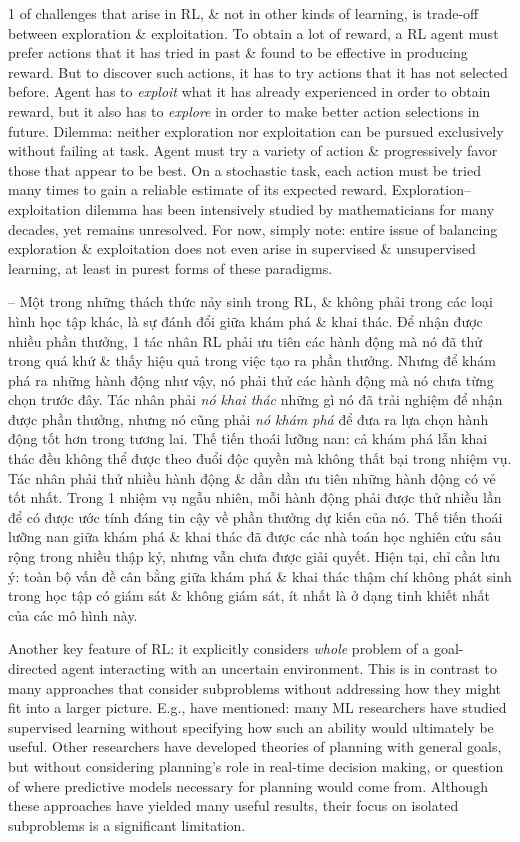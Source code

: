 \documentclass{article}
\begin{document}
\begin{itemize}
\begin{itemize}
        1 of challenges that arise in RL, \& not in other kinds of learning, is trade-off between exploration \& exploitation. To obtain a lot of reward, a RL agent must prefer actions that it has tried in past \& found to be effective in producing reward. But to discover such actions, it has to try actions that it has not selected before. Agent has to {\it exploit} what it has already experienced in order to obtain reward, but it also has to {\it explore} in order to make better action selections in future. Dilemma: neither exploration nor exploitation can be pursued exclusively without failing at task. Agent must try a variety of action \& progressively favor those that appear to be best. On a stochastic task, each action must be tried many times to gain a reliable estimate of its expected reward. Exploration--exploitation dilemma has been intensively studied by mathematicians for many decades, yet remains unresolved. For now, simply note: entire issue of balancing exploration \& exploitation does not even arise in supervised \& unsupervised learning, at least in purest forms of these paradigms.

        -- Một trong những thách thức nảy sinh trong RL, \& không phải trong các loại hình học tập khác, là sự đánh đổi giữa khám phá \& khai thác. Để nhận được nhiều phần thưởng, 1 tác nhân RL phải ưu tiên các hành động mà nó đã thử trong quá khứ \& thấy hiệu quả trong việc tạo ra phần thưởng. Nhưng để khám phá ra những hành động như vậy, nó phải thử các hành động mà nó chưa từng chọn trước đây. Tác nhân phải {\it nó khai thác} những gì nó đã trải nghiệm để nhận được phần thưởng, nhưng nó cũng phải {\it nó khám phá} để đưa ra lựa chọn hành động tốt hơn trong tương lai. Thế tiến thoái lưỡng nan: cả khám phá lẫn khai thác đều không thể được theo đuổi độc quyền mà không thất bại trong nhiệm vụ. Tác nhân phải thử nhiều hành động \& dần dần ưu tiên những hành động có vẻ tốt nhất. Trong 1 nhiệm vụ ngẫu nhiên, mỗi hành động phải được thử nhiều lần để có được ước tính đáng tin cậy về phần thưởng dự kiến của nó. Thế tiến thoái lưỡng nan giữa khám phá \& khai thác đã được các nhà toán học nghiên cứu sâu rộng trong nhiều thập kỷ, nhưng vẫn chưa được giải quyết. Hiện tại, chỉ cần lưu ý: toàn bộ vấn đề cân bằng giữa khám phá \& khai thác thậm chí không phát sinh trong học tập có giám sát \& không giám sát, ít nhất là ở dạng tinh khiết nhất của các mô hình này.

        Another key feature of RL: it explicitly considers {\it whole} problem of a goal-directed agent interacting with an uncertain environment. This is in contrast to many approaches that consider subproblems without addressing how they might fit into a larger picture. E.g., have mentioned: many ML researchers have studied supervised learning without specifying how such an ability would ultimately be useful. Other researchers have developed theories of planning with general goals, but without considering planning's role in real-time decision making, or question of where predictive models necessary for planning would come from. Although these approaches have yielded many useful results, their focus on isolated subproblems is a significant limitation.


\end{itemize}
\end{itemize}
\end{document}
